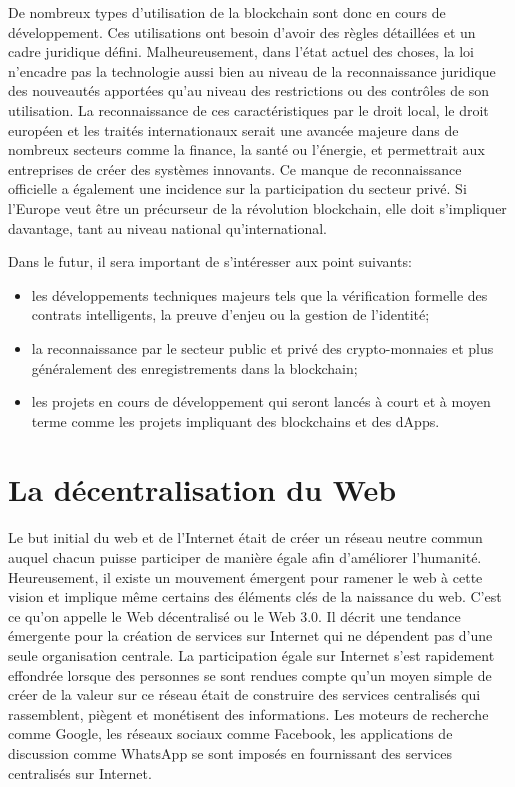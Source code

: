 \documentclass{tnreport}
\begin{document}
De nombreux types d'utilisation de la blockchain sont donc en cours de développement.
Ces utilisations ont besoin d'avoir des règles détaillées et un cadre juridique défini. Malheureusement, dans l'état actuel des choses, la loi n'encadre pas la technologie aussi bien au niveau de la reconnaissance juridique des nouveautés apportées qu'au niveau des restrictions ou des contrôles de son utilisation.
La reconnaissance de ces caractéristiques par le droit local, le droit européen et les traités internationaux serait une avancée majeure dans de nombreux secteurs comme la finance, la santé ou l'énergie, et permettrait aux entreprises de créer des systèmes innovants.
Ce manque de reconnaissance officielle a également une incidence sur la participation du secteur privé.
Si l'Europe veut être un précurseur de la révolution blockchain, elle doit s'impliquer davantage, tant au niveau national qu'international.

Dans le futur, il sera important de s'intéresser aux point suivants:
\begin{itemize}
	\item les développements techniques majeurs tels que la vérification formelle des contrats intelligents, la preuve d'enjeu ou la gestion de l'identité;
	\item la reconnaissance par le secteur public et privé des crypto-monnaies et plus généralement des enregistrements dans la blockchain;
	\item les projets en cours de développement qui seront lancés à court et à moyen terme comme les projets impliquant des blockchains et des dApps.
\end{itemize}

\section{La décentralisation du Web}

Le but initial du web et de l'Internet était de créer un réseau neutre commun auquel chacun puisse participer de manière égale afin d'améliorer l'humanité. Heureusement, il existe un mouvement émergent pour ramener le web à cette vision et implique même certains des éléments clés de la naissance du web. C'est ce qu'on appelle le Web décentralisé ou le Web 3.0. Il décrit une tendance émergente pour la création de services sur Internet qui ne dépendent pas d'une seule organisation centrale.
La participation égale sur Internet s'est rapidement effondrée lorsque des personnes se sont rendues compte qu'un moyen simple de créer de la valeur sur ce réseau était de construire des services centralisés qui rassemblent, piègent et monétisent des informations.
Les moteurs de recherche comme Google, les réseaux sociaux comme Facebook, les applications de discussion comme WhatsApp se sont imposés en fournissant des services centralisés sur Internet.
\end{document}
